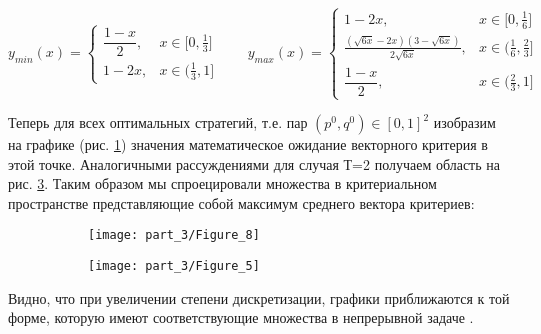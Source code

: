 $
	y_{min}(x) =
	\begin{cases}
		\dfrac{1 - x}{2}, & x \in \big[0, \frac{1}{3} \big] 
		\\
		1 - 2x, & x \in \big( \frac{1}{3}, 1\big]
	\end{cases}
	\qquad
	y_{max}(x) =
	\begin{cases}
		1 - 2x, & x \in \big[0, \frac{1}{6} \big] 
		\\
		\frac{(\sqrt{6x} - 2x)(3 - \sqrt{6x})}{2 \sqrt{6x}}, &
		x \in \big(\frac{1}{6}, \frac{2}{3} \big]
		\\
		\dfrac{1 - x}{2}, & x \in \big(\frac{2}{3}, 1 \big]
	\end{cases}
$

Теперь для всех оптимальных стратегий, т.е. пар 
$(p^0, q^0) \in [0, 1]^{2}$ изобразим на графике
(рис. \ref{fig:EF_1}) значения математическое ожидание векторного критерия 
в этой точке. Аналогичными рассуждениями для случая Т=2 получаем область на
рис. \ref{fig:EF_2}. Таким образом мы спроецировали множества в
критериальном пространстве представляющие собой максимум среднего вектора
критериев:

\begin{figure}[H]
	\centering
	\begin{subfigure}[b]{0.47 \textwidth}
		\centering		
		\texttt{[image: part\_3/Figure\_8]}
		\caption{}
		\label{fig:EF_1}
	\end{subfigure}	
	\begin{subfigure}[b]{0.47 \textwidth}
		\centering		
		\texttt{[image: part\_3/Figure\_5]}
		\caption{}
		\label{fig:EF_2}
	\end{subfigure}
	\caption{}	
\end{figure}

Видно, что при увеличении степени дискретизации, графики
приближаются к той форме, которую имеют соответствующие множества
в непрерывной задаче \cite{novikova}.